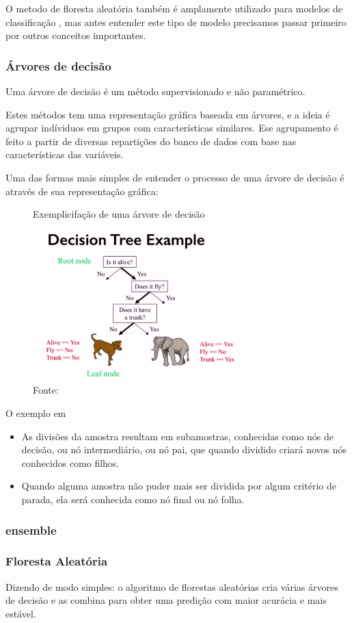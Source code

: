 O metodo de floresta aleatória também é amplamente utilizado para modelos de classificação , mas antes entender este tipo de modelo precisamos passar primeiro por outros conceitos importantes.


\subsubsection{Árvores de decisão}

Uma árvore de decisão é um método supervisionado e não paramétrico.

Estes métodos tem uma representação gráfica baseada em árvores, e a ideia é agrupar indíviduos em grupos com características similares. Ese agrupamento é feito a partir de diversas repartições do banco de dados com base nas características das variáveis.


Uma das formas mais simples de entender o processo de uma árvore de decisão é através de sua representação gráfica:


\begin{figure}
\centering
\caption{Exemplicifação de uma árvore de decisão}
  \includegraphics[width=8cm]{"images/dTreeExample.png"}
\caption*{Fonte: }%
  \label{dTree}
\end{figure} 

O exemplo em %




\begin{itemize}

\item As divisões da amostra resultam em subamostras, conhecidas como nós de decisão, ou nó intermediário, ou nó pai, que quando dividido criará novos nós conhecidos como filhos.
\item Quando alguma amostra não puder mais ser dividida por algum critério de parada, ela será conhecida como nó final ou nó folha.

\end{itemize}


\subsubsection{ensemble}


\subsubsection{Floresta Aleatória}



Dizendo de modo simples: o algoritmo de florestas aleatórias cria várias árvores de decisão e as combina para obter uma predição com maior acurácia e mais estável.
